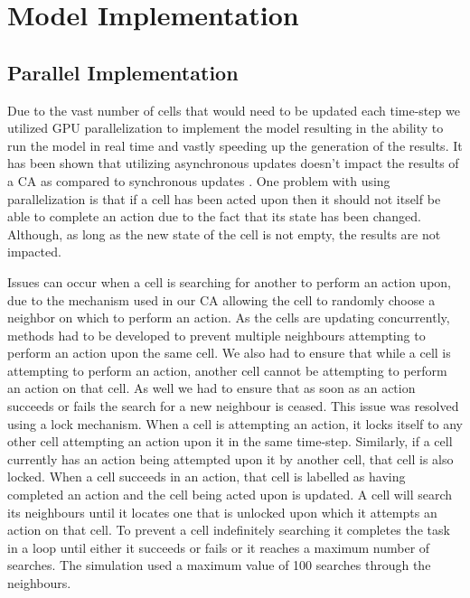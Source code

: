 \documentclass[\main/thesis.tex]{subfiles}
\begin{document}
\section{Model Implementation}

\subsection{Parallel Implementation}
Due to the vast number of cells that would need to be updated each time-step we utilized GPU parallelization to implement the model resulting in the ability to run the model in real time and vastly speeding up the generation of the results. It has been shown that utilizing asynchronous updates doesn't impact the results of a CA as compared to synchronous updates \cite{Schonfisch}. One problem with using parallelization is that if a cell has been acted upon then it should not itself be able to complete an action due to the fact that its state has been changed. Although, as long as the new state of the cell is not empty, the results are not impacted.

Issues can occur when a cell is searching for another to perform an action upon, due to the mechanism used in our CA allowing the cell to randomly choose a neighbor on which to perform an action. As the cells are updating concurrently, methods had to be developed to prevent multiple neighbours attempting to perform an action upon the same cell. We also had to ensure that while a cell is attempting to perform an action, another cell cannot be attempting to perform an action on that cell. As well we had to ensure that as soon as an action succeeds or fails the search for a new neighbour is ceased. This issue was resolved using a lock mechanism. When a cell is attempting an action, it locks itself to any other cell attempting an action upon it in the same time-step. Similarly, if a cell currently has an action being attempted upon it by another cell, that cell is also locked. When a cell succeeds in an action, that cell is labelled as having completed an action and the cell being acted upon is updated. A cell will search its neighbours until it locates one that is unlocked upon which it attempts an action on that cell. To prevent a cell indefinitely searching it completes the task in a loop until either it succeeds or fails or it reaches a maximum number of searches. The simulation used a maximum value of 100 searches through the neighbours.
\end{document}

